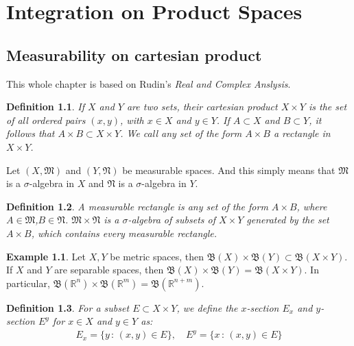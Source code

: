 \documentclass[11pt]{book}
\newtheorem{definition}{Definition}[chapter]
\theoremstyle{definition}
\newtheorem{example}{Example}[chapter]
\numberwithin{equation}{chapter}
\begin{document}
\chapter{Integration on Product Spaces}

\section{Measurability on cartesian product}

This whole chapter is based on Rudin's {\em Real and Complex Anslysis}\cite{2}. 

\medskip

\begin{definition}
If $X$ and $Y$ are two sets, their cartesian product $X \times Y$ is the set of all ordered pairs $(x, y)$, with $x \in X$ and $y \in Y$. If $A \subset X$ and $B \subset Y$, it follows that $A \times B \subset X \times Y$. We call any set of the form $A \times B$ a rectangle in $X \times Y$.
\end{definition}

\medskip

Let $(X,\mathfrak{M})$ and $(Y,\mathfrak{N})$ be measurable spaces. And this simply means that $\mathfrak{M}$ is a $\sigma$-algebra in $X$ and $\mathfrak{N}$ is a $\sigma$-algebra in $Y$.

\medskip

\begin{definition}
A measurable rectangle is any set of the form $A \times B$, where $A \in \mathfrak{M}$,$B \in \mathfrak{N}$.  $\mathfrak{M} \times \mathfrak{N}$ is a $\sigma$-algebra of subsets of $X \times Y$ generated by the set $A \times B$, which contains every measurable rectangle.
\end{definition}

\medskip

\begin{example}
Let $X,Y$ be metric spaces, then $\mathfrak{B}(X) \times \mathfrak{B}(Y) \subset \mathfrak{B}(X \times Y)$. If $X$ and $Y$ are separable spaces, then $\mathfrak{B}(X) \times \mathfrak{B}(Y) = \mathfrak{B}(X \times Y)$. In particular, $\mathfrak{B}(\mathbb{R}^n) \times \mathfrak{B}(\mathbb{R}^m) = \mathfrak{B}(\mathbb{R}^{n+m})$.
\end{example}

\medskip

\begin{definition}
For a subset $E \subset X \times Y$, we define the $x$-section $E_x$ and $y$-section $E^y$ for $x \in X$ and $y \in Y$ as:
\begin{align*}
    E_x = \{y \,:\, (x,y) \in E\}, \quad E^y = \{x \,:\, (x,y) \in E\}
\end{align*}
\end{definition}
\end{document}
